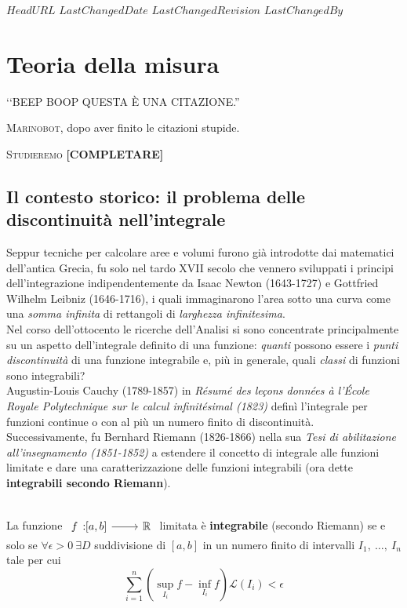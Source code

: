 \svnidlong
{$HeadURL$}
{$LastChangedDate$}
{$LastChangedRevision$}
{$LastChangedBy$}

\chapter{Teoria della misura}

\begin{introduction}
	‘‘BEEP BOOP QUESTA È UNA CITAZIONE.''
\begin{flushright}
	\textsc{Marinobot,} dopo aver finito le citazioni stupide.
\end{flushright}
\end{introduction}
\lettrine[findent=1pt, nindent=0pt]{S}{tudieremo} \textbf{[COMPLETARE]}
\section{Il contesto storico: il problema delle discontinuità nell'integrale}
Seppur tecniche per calcolare aree e volumi furono già introdotte dai matematici dell'antica Grecia, fu solo nel tardo XVII secolo che vennero sviluppati i principi dell'integrazione indipendentemente da Isaac Newton (1643-1727) e Gottfried Wilhelm Leibniz (1646-1716), i quali immaginarono l'area sotto una curva come una \textit{somma infinita} di rettangoli di \textit{larghezza infinitesima}.\\
Nel corso dell'ottocento le ricerche dell'Analisi si sono concentrate principalmente su un aspetto dell'integrale definito di una funzione: \textit{quanti} possono essere i \textit{punti discontinuità} di una funzione
integrabile e, più in generale, quali \textit{classi} di funzioni sono integrabili?\\
Augustin-Louis Cauchy (1789-1857) in \textit{Résumé des leçons données à	l’École Royale Polytechnique sur le calcul infinitésimal (1823)} definì l'integrale per funzioni continue o con al più un numero finito di discontinuità.\\
Successivamente, fu Bernhard Riemann (1826-1866) nella sua \textit{Tesi di abilitazione all'insegnamento (1851-1852)} a estendere il concetto di integrale alle funzioni limitate e dare una caratterizzazione delle funzioni integrabili (ora dette \textbf{integrabili secondo Riemann}).
\begin{define}~{}\\
La funzione $\funz{f}{\left[a,b\right]}{\realset}$ limitata è \textbf{integrabile} (secondo Riemann) se e solo se $\forall \epsilon>0\ \exists D$ suddivisione di $\left[a,b\right]$ in un numero finito di intervalli $I_1,\ \ldots,\ I_n$ tale per cui
\begin{equation}
	\sum_{i=1}^{n}\left(\sup_{I_i}f-\inf_{I_i}f\right)\mathcal{L}\left(I_i\right)<\epsilon
\end{equation}
\end{define}
